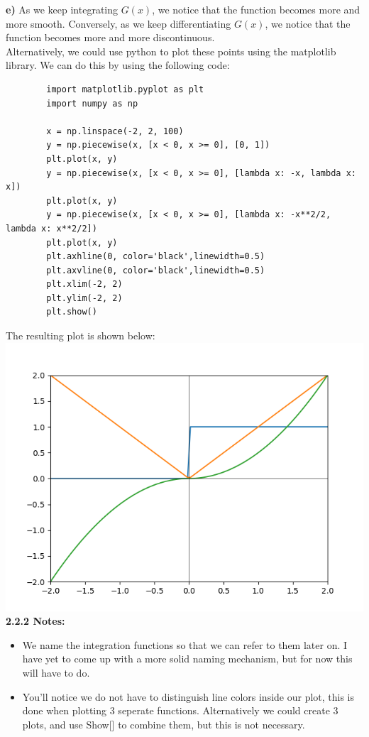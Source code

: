\documentclass{article}
\begin{document}
    \textbf{e)} As we keep integrating $G(x)$, we notice that the function becomes more and more smooth. Conversely, as we keep differentiating $G(x)$, we notice that the function becomes more and more discontinuous. \\

    Alternatively, we could use python to plot these points using the matplotlib library. We can do this by using the following code: \\
    \begin{verbatim}
        import matplotlib.pyplot as plt
        import numpy as np
                
        x = np.linspace(-2, 2, 100)
        y = np.piecewise(x, [x < 0, x >= 0], [0, 1])
        plt.plot(x, y)
        y = np.piecewise(x, [x < 0, x >= 0], [lambda x: -x, lambda x: x])
        plt.plot(x, y)
        y = np.piecewise(x, [x < 0, x >= 0], [lambda x: -x**2/2, lambda x: x**2/2])
        plt.plot(x, y)
        plt.axhline(0, color='black',linewidth=0.5)
        plt.axvline(0, color='black',linewidth=0.5)
        plt.xlim(-2, 2)
        plt.ylim(-2, 2)
        plt.show()
    \end{verbatim}
    \vfill
    \newpage 
    \headheight=10pt
    The resulting plot is shown below: \\
    \includegraphics[scale=0.5]{2.2.2d_py.png} \\

    \textbf{2.2.2 Notes:} 
    \begin{itemize}
        \item We name the integration functions so that we can refer to them later on. I have yet to come up with a more solid naming mechanism, but for now this will have to do.
        \item You'll notice we do not have to distinguish line colors inside our plot, this is done when plotting 3 seperate functions. Alternatively we could create 3 plots, and use Show[] to combine them, but this is not necessary.
    \end{itemize}
    
\end{document}
